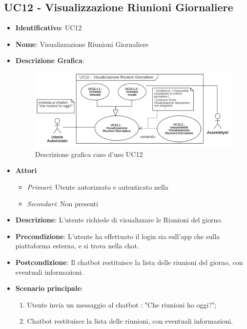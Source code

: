 \subsection{UC12 - Visualizzazione Riunioni Giornaliere }
\begin{itemize}
	\item \textbf{Identificativo}: UC12
	\item \textbf{Nome}: Visualizzazione Riunioni Giornaliere
	\item\textbf{Descrizione Grafica}: 
	\begin{figure}[h]
		\centering
		\includegraphics[scale=0.55]{images/UC12.png}
		\caption{Descrizione grafica caso d'uso UC12}
	 \end{figure}

	\item \textbf{Attori}
	\begin{itemize} 
		\item \textit{Primari}: Utente autorizzato e autenticato nella 
		\item \textit{Secondari}: Non presenti
	\end{itemize}
	\item \textbf{Descrizione}: L'utente richiede di visualizzare le Riunioni del giorno.
	\item \textbf{Precondizione}: L'utente ha effettuato il login sia sull'app che sulla piattaforma esterna, e si trova nella chat.
	\item \textbf{Postcondizione}: Il chatbot restituisce la lista delle riunioni del giorno, con eventuali informazioni.
	\item \textbf{Scenario principale}:  \begin{enumerate}
		\item Utente invia un messaggio al chatbot : "Che riunioni ho oggi?";
		\item Chatbot restituisce la lista delle riunioni, con eventuali informazioni.
	\end{enumerate}
\end{itemize}

